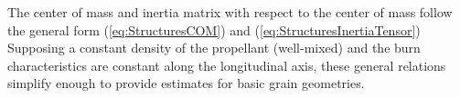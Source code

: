 \documentclass[11pt,dvipsnames]{thesis}
\begin{document}
The center of mass and inertia matrix with respect to the center of mass follow the general form (\ref{eq:StructuresCOM}) and (\ref{eq:StructuresInertiaTensor})
Supposing a constant density of the propellant (well-mixed) and the burn characteristics are constant along the longitudinal axis, these general relations simplify enough to provide estimates for basic grain geometries.
\end{document}
